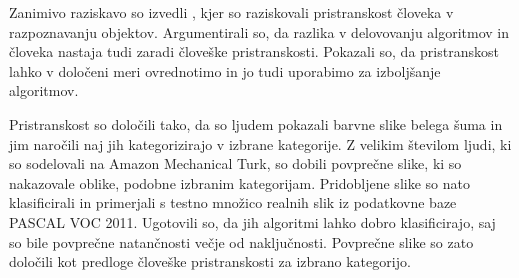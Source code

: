 Zanimivo raziskavo so izvedli , kjer so raziskovali pristranskost človeka v razpoznavanju objektov. Argumentirali so, da razlika v delovovanju algoritmov in človeka nastaja tudi zaradi človeške pristranskosti. Pokazali so, da pristranskost lahko v določeni meri ovrednotimo in jo tudi uporabimo za izboljšanje algoritmov. 

Pristranskost so določili tako, da so ljudem pokazali barvne slike belega šuma in jim naročili naj jih kategorizirajo v izbrane kategorije. Z velikim številom ljudi, ki so sodelovali na Amazon Mechanical Turk, so dobili povprečne slike, ki so nakazovale oblike, podobne izbranim kategorijam. Pridobljene slike so nato klasificirali in primerjali s testno množico realnih slik iz podatkovne baze PASCAL VOC 2011. Ugotovili so, da jih algoritmi lahko dobro klasificirajo, saj so bile povprečne natančnosti večje od naključnosti. Povprečne slike so  zato določili kot predloge človeške pristranskosti za izbrano kategorijo. 






